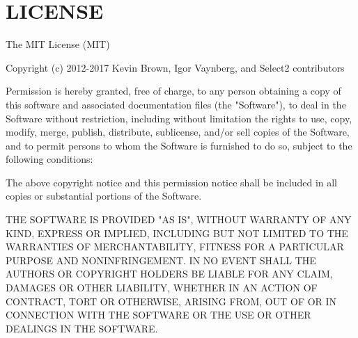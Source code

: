 \chapter{LICENSE}
\hypertarget{md__documents_2_git_hub_2bp2024_2smart__greenhouse__thesis_2_b_p2025___p_i4___c_o_d_e_2staticfil4a91bd246cb42727bb274c7241a5888b}{}\label{md__documents_2_git_hub_2bp2024_2smart__greenhouse__thesis_2_b_p2025___p_i4___c_o_d_e_2staticfil4a91bd246cb42727bb274c7241a5888b}
The MIT License (MIT)

Copyright (c) 2012-\/2017 Kevin Brown, Igor Vaynberg, and Select2 contributors

Permission is hereby granted, free of charge, to any person obtaining a copy of this software and associated documentation files (the "{}\+Software"{}), to deal in the Software without restriction, including without limitation the rights to use, copy, modify, merge, publish, distribute, sublicense, and/or sell copies of the Software, and to permit persons to whom the Software is furnished to do so, subject to the following conditions\+:

The above copyright notice and this permission notice shall be included in all copies or substantial portions of the Software.

THE SOFTWARE IS PROVIDED "{}\+AS IS"{}, WITHOUT WARRANTY OF ANY KIND, EXPRESS OR IMPLIED, INCLUDING BUT NOT LIMITED TO THE WARRANTIES OF MERCHANTABILITY, FITNESS FOR A PARTICULAR PURPOSE AND NONINFRINGEMENT. IN NO EVENT SHALL THE AUTHORS OR COPYRIGHT HOLDERS BE LIABLE FOR ANY CLAIM, DAMAGES OR OTHER LIABILITY, WHETHER IN AN ACTION OF CONTRACT, TORT OR OTHERWISE, ARISING FROM, OUT OF OR IN CONNECTION WITH THE SOFTWARE OR THE USE OR OTHER DEALINGS IN THE SOFTWARE. 